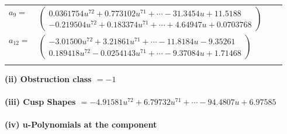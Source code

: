 \documentclass[1p]{elsarticle_modified}
\theoremstyle{definition}
\begin{document}
\begin{tabular}{m{7pt} m{180pt} m{7pt} m{180pt} }
\flushright $a_{9}=$&$\begin{pmatrix}0.0361754 u^{72}+0.773102 u^{71}+\cdots-31.3454 u+11.5188\\-0.219504 u^{72}+0.183374 u^{71}+\cdots+4.64947 u+0.0703768\end{pmatrix}$ \\
\flushright $a_{12}=$&$\begin{pmatrix}-3.01500 u^{72}+3.21861 u^{71}+\cdots-11.8184 u-9.35261\\0.189418 u^{72}-0.0254143 u^{71}+\cdots-9.37084 u+1.71468\end{pmatrix}$\\&\end{tabular}
\flushleft \textbf{(ii) Obstruction class $= -1$}\\~\\
\flushleft \textbf{(iii) Cusp Shapes $= -4.91581 u^{72}+6.79732 u^{71}+\cdots-94.4807 u+6.97585$}\\~\\
\newpage\renewcommand{\arraystretch}{1}
\flushleft \textbf{(iv) u-Polynomials at the component}\newline \\
\end{document}
